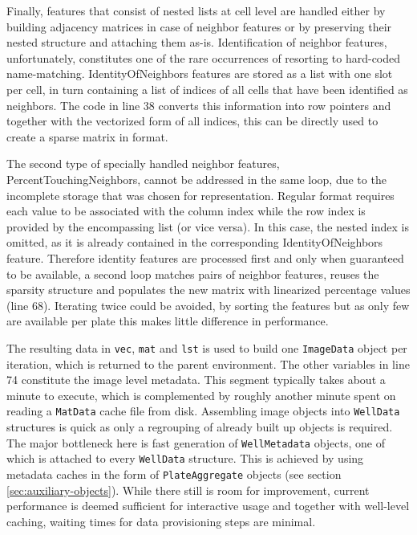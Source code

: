 Finally, features that consist of nested lists at cell level are handled either by building adjacency matrices in case of neighbor features or by preserving their nested structure and attaching them as-is. Identification of neighbor features, unfortunately, constitutes one of the rare occurrences of resorting to hard-coded name-matching. IdentityOfNeighbors features are stored as a list with one slot per cell, in turn containing a list of indices of all cells that have been identified as neighbors. The code in line 38 converts this information into row pointers and together with the vectorized form of all indices, this can be directly used to create a sparse matrix in  format.

The second type of specially handled neighbor features, PercentTouchingNeighbors, cannot be addressed in the same loop, due to the incomplete  storage that was chosen for representation. Regular  format requires each value to be associated with the column index while the row index is provided by the encompassing list (or vice versa). In this case, the nested index is omitted, as it is already contained in the corresponding IdentityOfNeighbors feature. Therefore identity features are processed first and only when guaranteed to be available, a second loop matches pairs of neighbor features, reuses the sparsity structure and populates the new matrix with linearized percentage values (line 68). Iterating twice could be avoided, by sorting the features but as only few are available per plate this makes little difference in performance.

The resulting data in \texttt{vec}, \texttt{mat} and \texttt{lst} is used to build one \texttt{ImageData} object per iteration, which is returned to the parent environment. The other variables in line 74 constitute the image level metadata. This segment typically takes about a minute to execute, which is complemented by roughly another minute spent on reading a \texttt{MatData} cache file from disk. Assembling image objects into \texttt{WellData} structures is quick as only a regrouping of already built up objects is required. The major bottleneck here is fast generation of \texttt{WellMetadata} objects, one of which is attached to every \texttt{WellData} structure. This is achieved by using metadata caches in the form of \texttt{PlateAggregate} objects (see section \ref{sec:auxiliary-objects}). While there still is room for improvement, current performance is deemed sufficient for interactive usage and together with well-level caching, waiting times for data provisioning steps are minimal.

